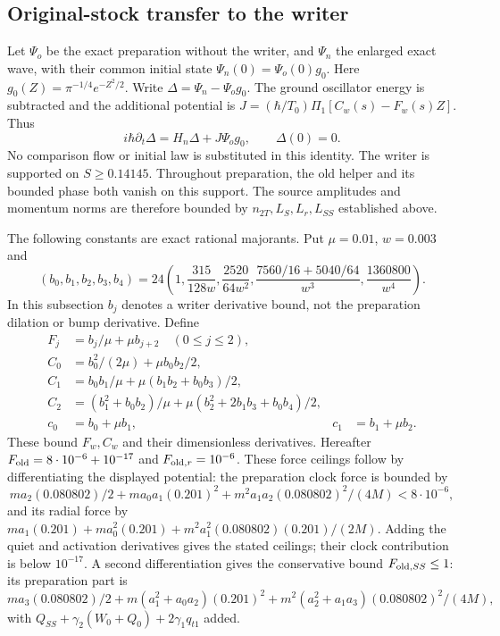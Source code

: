 \documentclass[11pt]{article}
\theoremstyle{definition}\newtheorem{definition}[theorem]{Definition}
\theoremstyle{remark}\newtheorem{remark}[theorem]{Remark}
\begin{document}
\subsection{Original-stock transfer to the writer}\label{prep:transfer}
Let $\Psi_o$ be the exact preparation without the writer, and $\Psi_n$
the enlarged exact wave, with their common initial state
$\Psi_n(0)=\Psi_o(0)g_0$. Here $g_0(Z)=\pi^{-1/4}e^{-Z^2/2}$.
Write $\Delta=\Psi_n-\Psi_og_0$. The ground oscillator energy is
subtracted and the additional potential is
$J=(\hbar/T_0)\Pi_1[C_w(s)-F_w(s)Z]$. Thus
\[
 i\hbar\partial_t\Delta=H_n\Delta+J\Psi_og_0,\qquad\Delta(0)=0.
\]
No comparison flow or initial law is substituted in this identity.
The writer is supported on $S\ge0.14145$. Throughout preparation,
the old helper and its bounded phase both vanish on this support. The source amplitudes and momentum
norms are therefore bounded by $n_{2T},L_S,L_r,L_{SS}$ established above.

The following constants are exact rational majorants. Put $\mu=0.01$,
$w=0.003$ and
\[
 (b_0,b_1,b_2,b_3,b_4)=24\left(1,\frac{315}{128w},
 \frac{2520}{64w^2},\frac{7560/16+5040/64}{w^3},
 \frac{1360800}{w^4}\right).
\]
In this subsection $b_j$ denotes a writer derivative bound, not the
preparation dilation or bump derivative. Define
\begin{align*}
 F_j&=b_j/\mu+\mu b_{j+2}\quad(0\le j\le2),\\
 C_0&=b_0^2/(2\mu)+\mu b_0b_2/2,\\
 C_1&=b_0b_1/\mu+\mu(b_1b_2+b_0b_3)/2,\\
 C_2&=(b_1^2+b_0b_2)/\mu
                  +\mu(b_2^2+2b_1b_3+b_0b_4)/2,\\
 c_0&=b_0+\mu b_1,& c_1&=b_1+\mu b_2.
\end{align*}
These bound $F_w,C_w$ and their dimensionless derivatives. Hereafter
$F_{\rm old}=8\cdot10^{-6}+10^{-17}$ and $F_{{\rm old},r}=10^{-6}$.
These force ceilings follow by differentiating the displayed potential:
the preparation clock force is bounded by
\[
 ma_2(0.080802)/2+ma_0a_1(0.201)^2
       +m^2a_1a_2(0.080802)^2/(4M)<8\cdot10^{-6},
\]
and its radial force by
$ma_1(0.201)+ma_0^2(0.201)+m^2a_1^2(0.080802)(0.201)/(2M)$.
Adding the quiet and activation derivatives gives the stated ceilings;
their clock contribution is below $10^{-17}$.
A second differentiation gives the conservative bound
$F_{{\rm old},SS}\le1$: its preparation part is
\[
 ma_3(0.080802)/2+m(a_1^2+a_0a_2)(0.201)^2
 +m^2(a_2^2+a_1a_3)(0.080802)^2/(4M),
\]
with $Q_{SS}+\gamma_2(W_0+Q_0)+2\gamma_1q_{t1}$ added.
\end{document}

